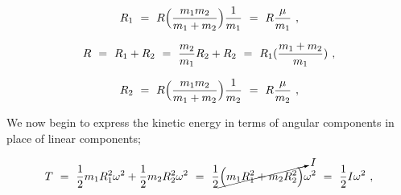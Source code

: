\documentclass{article}
\begin{document}
\begin{equation} \label{eb-eq-256-36}
R_1 \hspace{0.125cm} = \hspace{0.125cm} R \Big( \frac{m_1 m_2}{m_1 + m_2} \Big) \frac{1}{m_1} \hspace{0.125cm} = \hspace{0.125cm} R \frac{\mu}{m_1} \hspace{0.125cm} , 
\end{equation}

\begin{equation} \label{eb-eq-256-37}
R \hspace{0.125cm} = \hspace{0.125cm} R_1 + R_2 \hspace{0.125cm} = \hspace{0.125cm} \frac{m_2}{m_1} R_2 + R_2 \hspace{0.125cm} = \hspace{0.125cm} R_1 (\frac{m_1 + m_2}{m_1} ) \hspace{0.125cm} , 
\end{equation}

\begin{equation} \label{eb-eq-256-38}
R_2 \hspace{0.125cm} = \hspace{0.125cm} R \Big( \frac{m_1 m_2}{m_1 + m_2} \Big) \frac{1}{m_2} \hspace{0.125cm} = \hspace{0.125cm} R \frac{\mu}{m_2} \hspace{0.125cm} , 
\end{equation}

We now begin to express the kinetic energy in terms of angular components in place of linear components; 

\begin{equation} \label{eb-eq-256-39}
T \hspace{0.125cm} = \hspace{0.125cm} \frac{1}{2} m_1 R^{2}_{1} \omega^{2} + \frac{1}{2} m_2 R^{2}_{2} \omega^{2} \hspace{0.125cm} = \hspace{0.125cm} \frac{1}{2} \cancelto{I}{\Big( m_1 R^{2}_{1} + m_2 R^{2}_{2} \Big)} \omega^{2} \hspace{0.125cm} = \hspace{0.125cm} \frac{1}{2} I \omega^{2} \hspace{0.125cm} , 
\end{equation}
\end{document}
